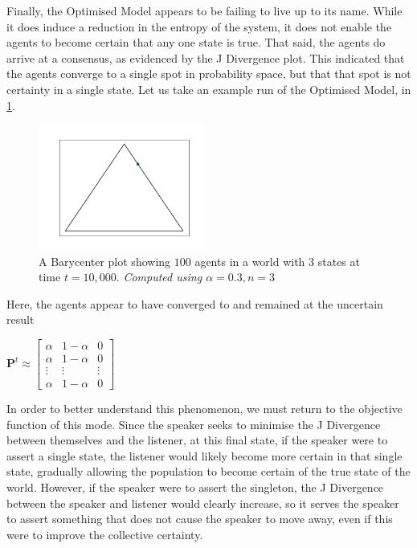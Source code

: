 Finally, the Optimised Model appears to be failing to live up to its name. While it does induce a reduction in the entropy of the system, it does not enable the agents to become certain that any one state is true. That said, the agents do arrive at a consensus, as evidenced by the J Divergence plot. This indicated that the agents converge to a single spot in probability space, but that that spot is not certainty in a single state. Let us take an example run of the Optimised Model, in \cref{fig:optimised_problem_case}. 

\begin{figure}[H]
    \centering
    \includegraphics[width=0.49\textwidth]{Images/Figures/Barycenter/Optimised_problem_case.png}
    \caption{ A Barycenter plot showing $100$ agents in a world with 3 states at time $t=10,000$. \textit{Computed using $\alpha = 0.3, n=3$} }
    \label{fig:optimised_problem_case}
\end{figure}

Here, the agents appear to have converged to and remained at the uncertain result

\begin{center}
$\mathbf{P}^t \approx \begin{bmatrix}
    \alpha & 1 - \alpha & 0 \\
    \alpha & 1 - \alpha & 0 \\
    \vdots & \vdots & \vdots \\
    \alpha & 1 - \alpha & 0
\end{bmatrix}$
\end{center}

In order to better understand this phenomenon, we must return to the objective function of this mode. Since the speaker seeks to minimise the J Divergence between themselves and the listener, at this final state, if the speaker were to assert a single state, the listener would likely become more certain in that single state, gradually allowing the population to become certain of the true state of the world. However, if the speaker were to assert the singleton, the J Divergence between the speaker and listener would clearly increase, so it serves the speaker to assert something that does not cause the speaker to move away, even if this were to improve the collective certainty. 



